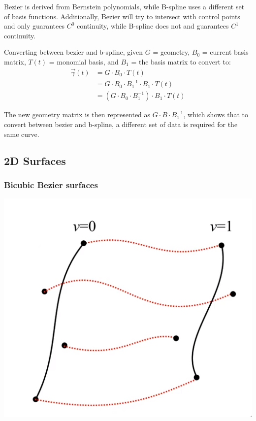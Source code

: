 \documentclass[12pt]{article}
\begin{document}
Bezier is derived from Bernstein polynomials, while B-spline uses a
different set of basis functions. Additionally, Bezier will try
to intersect with control points and only guarantees $C^0$ continuity,
while B-spline does not and guarantees $C^1$ continuity.

Converting between bezier and b-spline, given $G$ = geometry,
$B_0$ = current basis matrix, $T(t)$ = monomial basis, and $B_1$ =
the basis matrix to convert to:
\begin{align*}
    \vec \gamma(t) &= G \cdot B_0 \cdot T(t)\\
    &= G \cdot B_0 \cdot B_1^{-1} \cdot B_1 \cdot T(t)\\
    &= (G \cdot B_0 \cdot B_1^{-1}) \cdot B_1 \cdot T(t)
\end{align*}

The new geometry matrix is then represented as $G \cdot B \cdot
B_1^{-1}$, which shows that to convert between bezier and b-spline,
a different set of data is required for the same curve.

\subsection{2D Surfaces}

\subsubsection{Bicubic Bezier surfaces}
\includegraphics[scale=2]{images/surface-example.png}
\end{document}
